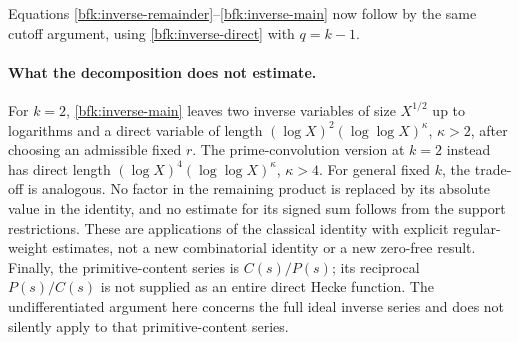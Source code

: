 Equations \eqref{bfk:inverse-remainder}--\eqref{bfk:inverse-main}
now follow by the same cutoff argument, using
\eqref{bfk:inverse-direct} with \(q=k-1\).

\paragraph{What the decomposition does not estimate.}
For \(k=2\), \eqref{bfk:inverse-main} leaves two inverse variables
of size \(X^{1/2}\) up to logarithms and a direct variable of
length \((\log X)^2(\log\log X)^\kappa\), \(\kappa>2\),
after choosing an admissible fixed \(r\).
The prime-convolution version at \(k=2\) instead has direct
length \((\log X)^4(\log\log X)^\kappa\), \(\kappa>4\).
For general fixed \(k\), the trade-off is analogous.
No factor in the remaining product is replaced by its absolute
value in the identity, and no estimate for its signed sum follows
from the support restrictions.
These are applications of the classical identity with explicit
regular-weight estimates, not a new combinatorial identity or
a new zero-free result.
Finally, the primitive-content series is \(C(s)/P(s)\); its
reciprocal \(P(s)/C(s)\) is not supplied as an entire direct Hecke
function.  The undifferentiated argument here concerns the full
ideal inverse series and does not silently apply to that
primitive-content series.
